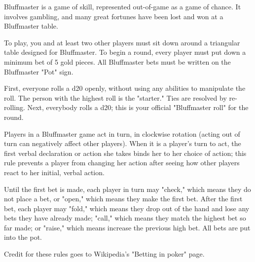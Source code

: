 \documentclass[green]{Kos}
\begin{document}
\name{\gBluffmaster{}}

Bluffmaster is a game of skill, represented out-of-game as a game of chance. It involves gambling, and many great fortunes have been lost and won at a Bluffmaster table.

To play, you and at least two other players must sit down around a triangular table designed for Bluffmaster. To begin a round, every player must put down a minimum bet of 5 gold pieces. All Bluffmaster bets must be written on the Bluffmaster "Pot" sign.

 First, everyone rolls a d20 openly, without using any abilities to manipulate the roll. The person with the highest roll is the "starter." Ties are resolved by re-rolling. Next, everybody rolls a d20; this is your official "Bluffmaster roll" for the round.

Players in a Bluffmaster game act in turn, in clockwise rotation (acting out of turn can negatively affect other players). When it is a player's turn to act, the first verbal declaration or action she takes binds her to her choice of action; this rule prevents a player from changing her action after seeing how other players react to her initial, verbal action.

Until the first bet is made, each player in turn may "check," which means they do not place a bet, or "open," which means they make the first bet. After the first bet, each player may "fold," which means they drop out of the hand and lose any bets they have already made; "call," which means they match the highest bet so far made; or "raise," which means increase the previous high bet. All bets are put into the pot.



\begin{itemz}[Notes]
\item Credit for these rules goes to Wikipedia's "Betting in poker" page.
\end{itemz}
\end{document}
